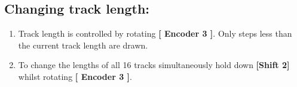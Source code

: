 \subsection{Changing track length:}
\begin{enumerate}
	\item Track length is controlled by rotating \textbf{[ Encoder 3 ]}. Only steps less than the current track length are drawn.
	\item To change the lengths of all 16 tracks simultaneously hold down \textbf{[Shift 2]} whilst rotating \textbf{[ Encoder 3 ]}.
\end{enumerate}

